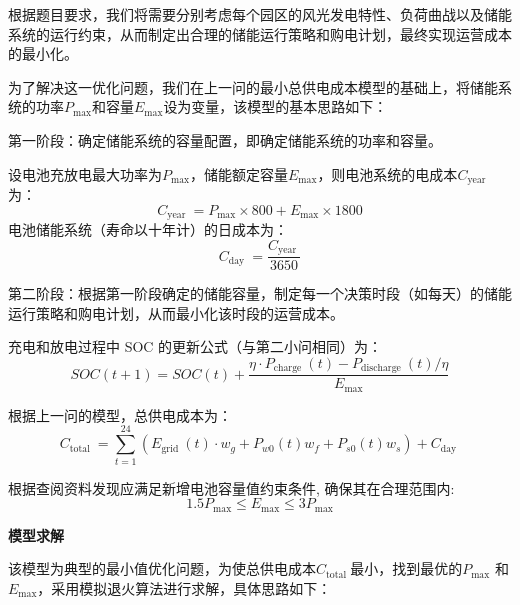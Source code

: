 \documentclass{cumcmthesis}
\begin{document}
根据题目要求，我们将需要分别考虑每个园区的风光发电特性、负荷曲战以及储能系统的运行约束，从而制定出合理的储能运行策略和购电计划，最终实现运营成本的最小化。

为了解决这一优化问题，我们在上一问的最小总供电成本模型的基础上，将储能系统的功率$P_{\max }$和容量$E_{\max }$设为变量，该模型的基本思路如下：

第一阶段：确定储能系统的容量配置，即确定储能系统的功率和容量。

设电池充放电最大功率为$P_{\max }$，储能额定容量$E_{\max }$，则电池系统的电成本$C_{\text {year }}$为：
\begin{equation}
C_{\text {year }}=P_{\max } \times 800+E_{\max } \times 1800
\end{equation}
电池储能系统（寿命以十年计）的日成本为：
\begin{equation}
C_{\text {day }}=\frac{C_{\text {year }}}{3650}
\end{equation}

第二阶段：根据第一阶段确定的储能容量，制定每一个决策时段（如每天）的储能运行策略和购电计划，从而最小化该时段的运营成本。

充电和放电过程中 SOC 的更新公式（与第二小问相同）为：
\begin{equation}
S O C(t+1)=S O C(t)+\frac{\eta \cdot P_{\text {charge }}(t)-P_{\text {discharge }}(t) / \eta}{E_{\max }}
\end{equation}

根据上一问的模型，总供电成本为：
\begin{equation}
C_{\text {total }}=\sum_{t=1}^{24}\left(E_{\text {grid }}(t) \cdot w_g+P_{w 0}(t) w_f+P_{s 0}(t) w_s\right)+C_{\text {day }}
\end{equation}

根据查阅资料发现应满足新增电池容量值约束条件, 确保其在合理范围内:
$$
1.5 P_{\max } \leq E_{\max } \leq 3 P_{\max }
$$

  
\textbf{模型求解}

该模型为典型的最小值优化问题，为使总供电成本$C_{\text {total }}$最小，找到最优的$P_{\max }$ 和 $E_{\max }$，采用模拟退火算法进行求解，具体思路如下：
\end{document}
